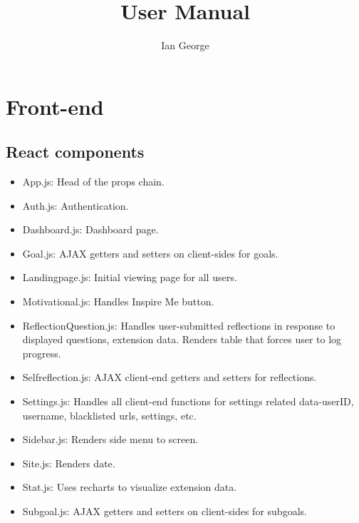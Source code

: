 \documentclass[letterpaper, 10 pt]{report}
\begin{document}
\title{User Manual}
\author{Ian George}
\maketitle
\pagestyle{empty}

\tableofcontents
\newpage

\section{Front-end}
\subsection{React components}
\begin{itemize}
\item App.js: Head of the props chain.
\item Auth.js: Authentication.
\item Dashboard.js: Dashboard page.
\item Goal.js: AJAX getters and setters on client-sides for goals.
\item Landingpage.js: Initial viewing page for all users.
\item Motivational.js: Handles Inspire Me button.
\item ReflectionQuestion.js: Handles user-submitted reflections in response to displayed questions, extension data. Renders table that forces user to log progress.
\item Selfreflection.js: AJAX client-end getters and setters for reflections.
\item Settings.js: Handles all client-end functions for settings related data-userID, username, blacklisted urls, settings, etc.
\item Sidebar.js: Renders side menu to screen.
\item Site.js: Renders date.
\item Stat.js: Uses recharts to visualize extension data.
\item Subgoal.js: AJAX getters and setters on client-sides for subgoals.
\end{itemize}
\end{document}
